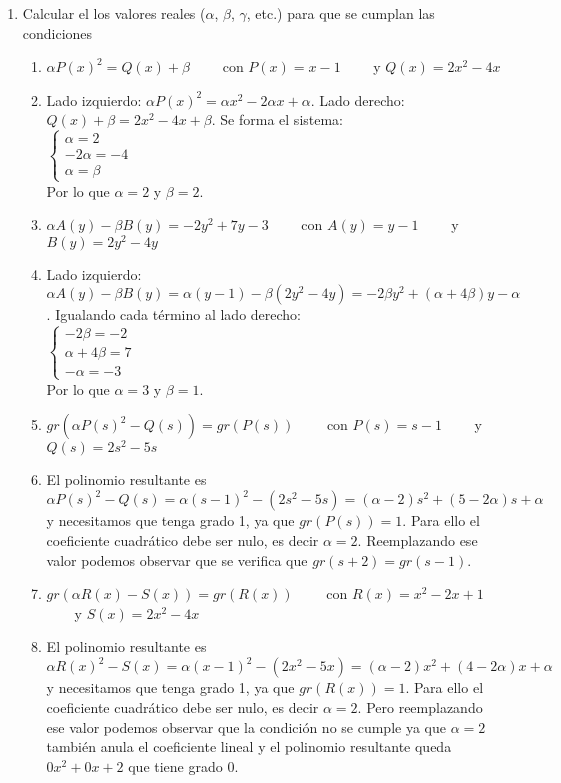 \documentclass[a4paper]{article}
\newcommand{\answer}{\item[**]}
\newcommand{\exercise}{\item}
\newcommand{\SEL}[1]{\left\{\begin{matrix} #1 \end{matrix}\right.}
\newcommand{\df}[2]{\displaystyle\frac{#1}{#2}}
\begin{document}
\begin{enumerate}
\begin{enumerate} [label=(\alph*)]
		\item $\df{x^2+3}{x-i}$
		\answer $\df{x^2+3}{x-i}=(x+i)+\df{2}{x-i}$

	\end{enumerate}

	\exercise Calcular el los valores reales ($\alpha$, $\beta$, $\gamma$, etc.) para que se cumplan las condiciones
	\begin{enumerate} [label=(\alph*)]
		
		\item $\alpha P(x)^2 = Q(x) +\beta$ ~~~~con $P(x)=x-1$ ~~~~y $Q(x)=2x^2-4x$
		\answer Lado izquierdo: $\alpha P(x)^2= \alpha x^2-2 \alpha x+ \alpha$. Lado derecho: $Q(x) +\beta= 2x^2-4x+\beta$. Se forma el sistema: \\ $\SEL{\alpha=2 \\ -2\alpha = -4 \\ \alpha= \beta}$ \\ Por lo que $\alpha=2$ y $\beta=2$.

		\item $\alpha A(y)-\beta B(y) = -2y^2 +7y-3$ ~~~~con $A(y)=y-1$ ~~~~y $B(y)=2y^2-4y$
		\answer Lado izquierdo: $\alpha A(y)-\beta B(y) = \alpha (y-1)- \beta (2y^2-4y)= -2\beta y^2 + (\alpha+4\beta) y - \alpha$. Igualando cada término al lado derecho: \\  $\SEL{-2\beta =-2 \\ \alpha+4\beta=7 \\ -\alpha=-3}$ \\ Por lo que $\alpha=3$ y $\beta=1$.

		\item $gr\left(\alpha P(s)^2 - Q(s)\right)=gr\left(P(s)\right)$ ~~~~con $P(s)=s-1$ ~~~~y $Q(s)=2s^2-5s$
		\answer El polinomio resultante es $\alpha P(s)^2 - Q(s)= \alpha (s-1)^2 - (2s^2-5s)= (\alpha-2) s^2 + (5-2\alpha) s + \alpha$ y necesitamos que tenga grado 1, ya que $gr\left(P(s)\right)=1$. Para ello el coeficiente cuadrático debe ser nulo, es decir $\alpha=2$. Reemplazando ese valor podemos observar que se verifica que $gr(s+2)=gr(s-1)$.

		\item $gr\left(\alpha R(x) - S(x)\right)=gr\left(R(x)\right)$ ~~~~con $R(x)=x^2-2x+1$ ~~~~y $S(x)=2x^2-4x$
		\answer El polinomio resultante es $\alpha R(x)^2 - S(x)= \alpha (x-1)^2 - (2x^2-5x)= (\alpha-2) x^2 + (4-2\alpha) x + \alpha$ y necesitamos que tenga grado 1, ya que $gr\left(R(x)\right)=1$. Para ello el coeficiente cuadrático debe ser nulo, es decir $\alpha=2$. Pero reemplazando ese valor podemos observar que la condición no se cumple ya que $\alpha=2$ también anula el coeficiente lineal y el polinomio resultante queda $0x^2+0x+2$ que tiene grado $0$.


\end{enumerate}
\end{enumerate}
\end{document}
